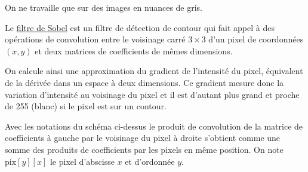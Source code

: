 \documentclass[a4paper, french, 12pt]{article}  %
\newcommand{\dx}{\ensuremath{\text{d}x}}		%
\newcommand{\dy}{\ensuremath{\text{d}y}}		%
\begin{document}
On ne travaille que sur des images en nuances de gris.

\begin{minipage}{0.45\linewidth}

\begin{center}
\end{center}

\end{minipage}\hfill
\begin{minipage}{0.45\linewidth}

\begin{center}
\end{center}
\end{minipage}

Le \href{https://fr.wikipedia.org/wiki/Filtre_de_Sobel}{filtre de Sobel} est un filtre de détection de contour qui fait appel à des opérations de convolution entre le voisinage carré $3 \times 3$ d'un pixel de coordonnées $(x,y)$ et deux matrices de coefficients  de mêmes dimensions.

On calcule ainsi une approximation du gradient de l'intensité du pixel, équivalent de la dérivée dans un espace à deux dimensions. Ce gradient mesure donc la variation d'intensité au voisinage du pixel et il est d'autant plus  grand et proche de 255 (blanc) si le pixel est sur un contour.  


Avec les notations du schéma ci-dessus le produit de convolution de la matrice de coefficients à gauche par le voisinage du pixel à droite s'obtient comme une somme des  produits de coefficients par les pixels en même position. On note $\text{pix}[y][x]$ le pixel d'abscisse $x$ et d'ordonnée $y$.
\end{document}
